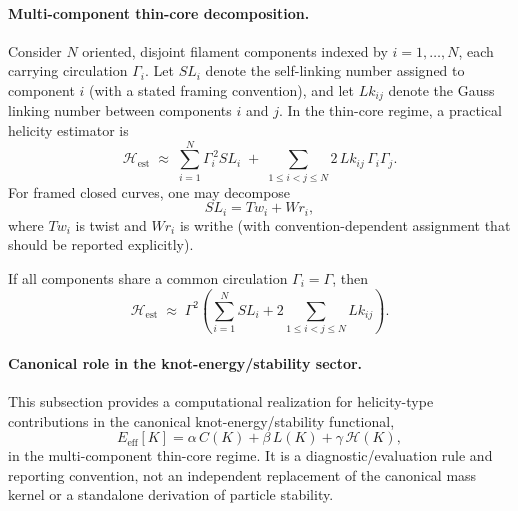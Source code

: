 \documentclass[10pt]{article}
\begin{document}
    \paragraph{Multi-component thin-core decomposition.}
    Consider \(N\) oriented, disjoint filament components indexed by \(i=1,\dots,N\), each carrying circulation \(\Gamma_i\). Let \(SL_i\) denote the self-linking number assigned to component \(i\) (with a stated framing convention), and let \(Lk_{ij}\) denote the Gauss linking number between components \(i\) and \(j\). In the thin-core regime, a practical helicity estimator is
    \begin{equation}
        \mathcal{H}_{\mathrm{est}}
        \;\approx\;
        \sum_{i=1}^{N}\Gamma_i^{\,2}SL_i
        \;+\;
        \sum_{1\le i<j\le N}2\,Lk_{ij}\,\Gamma_i\Gamma_j.
        \label{eq:helicity_multicomponent_decomp}
    \end{equation}
    For framed closed curves, one may decompose
    \begin{equation}
        SL_i = Tw_i + Wr_i,
        \label{eq:helicity_selflinking_split}
    \end{equation}
    where \(Tw_i\) is twist and \(Wr_i\) is writhe (with convention-dependent assignment that should be reported explicitly).

    If all components share a common circulation \(\Gamma_i=\Gamma\), then
    \begin{equation}
        \mathcal{H}_{\mathrm{est}}
        \;\approx\;
        \Gamma^2\!\left(
        \sum_{i=1}^{N}SL_i
        +2\sum_{1\le i<j\le N}Lk_{ij}
        \right).
        \label{eq:helicity_multicomponent_decomp_hom}
    \end{equation}

    \paragraph{Canonical role in the knot-energy/stability sector.}
    This subsection provides a computational realization for helicity-type contributions in the canonical knot-energy/stability functional,
    \begin{equation}
        E_{\mathrm{eff}}[K] = \alpha\,C(K)+\beta\,L(K)+\gamma\,\mathcal{H}(K),
    \end{equation}
    in the multi-component thin-core regime. It is a diagnostic/evaluation rule and reporting convention, not an independent replacement of the canonical mass kernel or a standalone derivation of particle stability.
\end{document}
